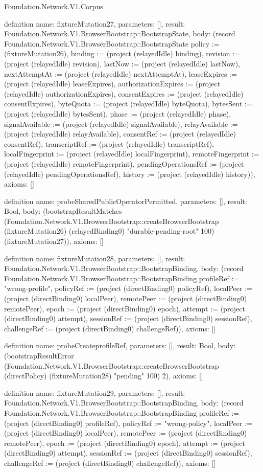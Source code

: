 \begin{lexlean}{Foundation.Network.V1.Corpus}
\begin{semanticmodule}
definition{
  name: fixtureMutation27,
  parameters: [],
  result: Foundation.Network.V1.BrowserBootstrap::BootstrapState,
  body: (record Foundation.Network.V1.BrowserBootstrap::BootstrapState {policy := (fixtureMutation26), binding := (project (relayedIdle) binding), revision := (project (relayedIdle) revision), lastNow := (project (relayedIdle) lastNow), nextAttemptAt := (project (relayedIdle) nextAttemptAt), leaseExpires := (project (relayedIdle) leaseExpires), authorizationExpires := (project (relayedIdle) authorizationExpires), consentExpires := (project (relayedIdle) consentExpires), byteQuota := (project (relayedIdle) byteQuota), bytesSent := (project (relayedIdle) bytesSent), phase := (project (relayedIdle) phase), signalAvailable := (project (relayedIdle) signalAvailable), relayAvailable := (project (relayedIdle) relayAvailable), consentRef := (project (relayedIdle) consentRef), transcriptRef := (project (relayedIdle) transcriptRef), localFingerprint := (project (relayedIdle) localFingerprint), remoteFingerprint := (project (relayedIdle) remoteFingerprint), pendingOperationsRef := (project (relayedIdle) pendingOperationsRef), history := (project (relayedIdle) history)}),
  axioms: []
}

definition{
  name: probeSharedPublicOperatorPermitted,
  parameters: [],
  result: Bool,
  body: (bootstrapResultMatches (Foundation.Network.V1.BrowserBootstrap::createBrowserBootstrap (fixtureMutation26) (relayedBinding0) "durable-pending-root" 100) (fixtureMutation27)),
  axioms: []
}

definition{
  name: fixtureMutation28,
  parameters: [],
  result: Foundation.Network.V1.BrowserBootstrap::BootstrapBinding,
  body: (record Foundation.Network.V1.BrowserBootstrap::BootstrapBinding {profileRef := "wrong-profile", policyRef := (project (directBinding0) policyRef), localPeer := (project (directBinding0) localPeer), remotePeer := (project (directBinding0) remotePeer), epoch := (project (directBinding0) epoch), attempt := (project (directBinding0) attempt), sessionRef := (project (directBinding0) sessionRef), challengeRef := (project (directBinding0) challengeRef)}),
  axioms: []
}

definition{
  name: probeCreateprofileRef,
  parameters: [],
  result: Bool,
  body: (bootstrapResultError (Foundation.Network.V1.BrowserBootstrap::createBrowserBootstrap (directPolicy) (fixtureMutation28) "pending" 100) 2),
  axioms: []
}

definition{
  name: fixtureMutation29,
  parameters: [],
  result: Foundation.Network.V1.BrowserBootstrap::BootstrapBinding,
  body: (record Foundation.Network.V1.BrowserBootstrap::BootstrapBinding {profileRef := (project (directBinding0) profileRef), policyRef := "wrong-policy", localPeer := (project (directBinding0) localPeer), remotePeer := (project (directBinding0) remotePeer), epoch := (project (directBinding0) epoch), attempt := (project (directBinding0) attempt), sessionRef := (project (directBinding0) sessionRef), challengeRef := (project (directBinding0) challengeRef)}),
  axioms: []
}


\end{semanticmodule}
\end{lexlean}
